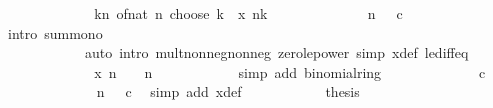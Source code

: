 \begin{isabellebody}
\ \ \ \ \ \ \ \ \isamarkupfalse%
\ \isamarkupfalse%
\ {\isachardoublequoteopen}{\isasymdots}\ {\isasymle}\ {\isacharparenleft}{\kern0pt}{\isasymSum}k{\isasymle}n{\isachardot}{\kern0pt}\ of{\isacharunderscore}{\kern0pt}nat\ {\isacharparenleft}{\kern0pt}n\ choose\ k{\isacharparenright}{\kern0pt}\ {\isacharasterisk}{\kern0pt}\ x\ n{\isacharcircum}{\kern0pt}k{\isacharparenright}{\kern0pt}{\isachardoublequoteclose}\isanewline
\ \ \ \ \ \ \ \ \ \ \isamarkupfalse%
\ {\isacartoucheopen}{}\ {\isacharless}{\kern0pt}\ n{\isacartoucheclose}\ {\isacartoucheopen}{}\ {\isasymle}\ c{\isacartoucheclose}\isanewline
\ \ \ \ \ \ \ \ \ \ \isamarkupfalse%
\ {\isacharparenleft}{\kern0pt}intro\ sum{\isacharunderscore}{\kern0pt}mono{}{\isacharparenright}{\kern0pt}\isanewline
\ \ \ \ \ \ \ \ \ \ \ \ {\isacharparenleft}{\kern0pt}auto\ intro{\isacharbang}{\kern0pt}{\isacharcolon}{\kern0pt}\ mult{\isacharunderscore}{\kern0pt}nonneg{\isacharunderscore}{\kern0pt}nonneg\ zero{\isacharunderscore}{\kern0pt}le{\isacharunderscore}{\kern0pt}power\ simp{\isacharcolon}{\kern0pt}\ x{\isacharunderscore}{\kern0pt}def\ le{\isacharunderscore}{\kern0pt}diff{\isacharunderscore}{\kern0pt}eq{\isacharparenright}{\kern0pt}\isanewline
\ \ \ \ \ \ \ \ \isamarkupfalse%
\ \isamarkupfalse%
\ {\isachardoublequoteopen}{\isasymdots}\ {\isacharequal}{\kern0pt}\ {\isacharparenleft}{\kern0pt}x\ n\ {\isacharplus}{\kern0pt}\ {}{\isacharparenright}{\kern0pt}\ {\isacharcircum}{\kern0pt}\ n{\isachardoublequoteclose}\isanewline
\ \ \ \ \ \ \ \ \ \ \isamarkupfalse%
\ {\isacharparenleft}{\kern0pt}simp\ add{\isacharcolon}{\kern0pt}\ binomial{\isacharunderscore}{\kern0pt}ring{\isacharparenright}{\kern0pt}\isanewline
\ \ \ \ \ \ \ \ \isamarkupfalse%
\ \isamarkupfalse%
\ {\isachardoublequoteopen}{\isasymdots}\ {\isacharequal}{\kern0pt}\ c{\isachardoublequoteclose}\isanewline
\ \ \ \ \ \ \ \ \ \ \isamarkupfalse%
\ {\isacartoucheopen}{}\ {\isacharless}{\kern0pt}\ n{\isacartoucheclose}\ {\isacartoucheopen}{}\ {\isasymle}\ c{\isacartoucheclose}\ \isamarkupfalse%
\ {\isacharparenleft}{\kern0pt}simp\ add{\isacharcolon}{\kern0pt}\ x{\isacharunderscore}{\kern0pt}def{\isacharparenright}{\kern0pt}\isanewline
\ \ \ \ \ \ \ \ \isamarkupfalse%
\ \isamarkupfalse%
\ {\isacharquery}{\kern0pt}thesis\isanewline
\ \ \ \ \ \ \ \ \ \ \isamarkupfalse%

\end{isabellebody}
